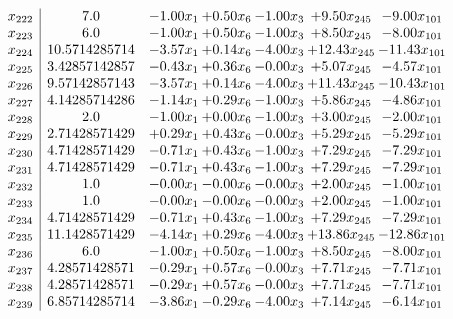 \documentclass[8pt]{article}
\begin{document}
\[\begin{array}{c| c c@{\hskip 2pt} c@{\hskip 2pt} c@{\hskip 2pt} c@{\hskip 2pt} c@{\hskip 2pt} }
 x_{222}   &  7.0 & -1.00 x_{1} & +  0.50 x_{6} & -1.00 x_{3} & +  9.50 x_{245} & -9.00 x_{101}\\
 x_{223}   &  6.0 & -1.00 x_{1} & +  0.50 x_{6} & -1.00 x_{3} & +  8.50 x_{245} & -8.00 x_{101}\\
 x_{224}   &  10.5714285714 & -3.57 x_{1} & +  0.14 x_{6} & -4.00 x_{3} & + 12.43 x_{245} & -11.43 x_{101}\\
 x_{225}   &  3.42857142857 & -0.43 x_{1} & +  0.36 x_{6} & -0.00 x_{3} & +  5.07 x_{245} & -4.57 x_{101}\\
 x_{226}   &  9.57142857143 & -3.57 x_{1} & +  0.14 x_{6} & -4.00 x_{3} & + 11.43 x_{245} & -10.43 x_{101}\\
 x_{227}   &  4.14285714286 & -1.14 x_{1} & +  0.29 x_{6} & -1.00 x_{3} & +  5.86 x_{245} & -4.86 x_{101}\\
 x_{228}   &  2.0 & -1.00 x_{1} & +  0.00 x_{6} & -1.00 x_{3} & +  3.00 x_{245} & -2.00 x_{101}\\
 x_{229}   &  2.71428571429 & +  0.29 x_{1} & +  0.43 x_{6} & -0.00 x_{3} & +  5.29 x_{245} & -5.29 x_{101}\\
 x_{230}   &  4.71428571429 & -0.71 x_{1} & +  0.43 x_{6} & -1.00 x_{3} & +  7.29 x_{245} & -7.29 x_{101}\\
 x_{231}   &  4.71428571429 & -0.71 x_{1} & +  0.43 x_{6} & -1.00 x_{3} & +  7.29 x_{245} & -7.29 x_{101}\\
 x_{232}   &  1.0 & -0.00 x_{1} & -0.00 x_{6} & -0.00 x_{3} & +  2.00 x_{245} & -1.00 x_{101}\\
 x_{233}   &  1.0 & -0.00 x_{1} & -0.00 x_{6} & -0.00 x_{3} & +  2.00 x_{245} & -1.00 x_{101}\\
 x_{234}   &  4.71428571429 & -0.71 x_{1} & +  0.43 x_{6} & -1.00 x_{3} & +  7.29 x_{245} & -7.29 x_{101}\\
 x_{235}   &  11.1428571429 & -4.14 x_{1} & +  0.29 x_{6} & -4.00 x_{3} & + 13.86 x_{245} & -12.86 x_{101}\\
 x_{236}   &  6.0 & -1.00 x_{1} & +  0.50 x_{6} & -1.00 x_{3} & +  8.50 x_{245} & -8.00 x_{101}\\
 x_{237}   &  4.28571428571 & -0.29 x_{1} & +  0.57 x_{6} & -0.00 x_{3} & +  7.71 x_{245} & -7.71 x_{101}\\
 x_{238}   &  4.28571428571 & -0.29 x_{1} & +  0.57 x_{6} & -0.00 x_{3} & +  7.71 x_{245} & -7.71 x_{101}\\
 x_{239}   &  6.85714285714 & -3.86 x_{1} & -0.29 x_{6} & -4.00 x_{3} & +  7.14 x_{245} & -6.14 x_{101}\\

\end{array}\]
\end{document}

